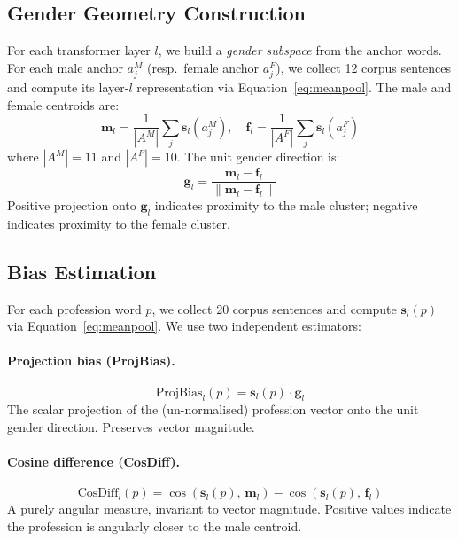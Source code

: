 \documentclass[11pt,a4paper]{article}
\begin{document}
\subsection{Gender Geometry Construction}

For each transformer layer $l$, we build a \emph{gender subspace} from the
anchor words. For each male anchor $a^M_j$ (resp.\ female anchor $a^F_j$), we
collect 12 corpus sentences and compute its layer-$l$ representation via
Equation~\ref{eq:meanpool}. The male and female centroids are:
\begin{equation}
  \mathbf{m}_l = \frac{1}{|A^M|} \sum_{j} \mathbf{s}_l(a^M_j), \quad
  \mathbf{f}_l = \frac{1}{|A^F|} \sum_{j} \mathbf{s}_l(a^F_j)
\end{equation}
where $|A^M|=11$ and $|A^F|=10$. The unit gender direction is:
\begin{equation}
  \mathbf{g}_l = \frac{\mathbf{m}_l - \mathbf{f}_l}
                      {\|\mathbf{m}_l - \mathbf{f}_l\|}
\end{equation}
Positive projection onto $\mathbf{g}_l$ indicates proximity to the male cluster;
negative indicates proximity to the female cluster.

\subsection{Bias Estimation}

For each profession word $p$, we collect 20 corpus sentences and compute
$\mathbf{s}_l(p)$ via Equation~\ref{eq:meanpool}. We use two independent
estimators:

\paragraph{Projection bias (ProjBias).}
\begin{equation}
  \text{ProjBias}_l(p) = \mathbf{s}_l(p) \cdot \mathbf{g}_l
  \label{eq:proj}
\end{equation}
The scalar projection of the (un-normalised) profession vector onto the unit
gender direction. Preserves vector magnitude.

\paragraph{Cosine difference (CosDiff).}
\begin{equation}
  \text{CosDiff}_l(p) =
    \cos\!\left(\mathbf{s}_l(p),\,\mathbf{m}_l\right) -
    \cos\!\left(\mathbf{s}_l(p),\,\mathbf{f}_l\right)
  \label{eq:cosdiff}
\end{equation}
A purely angular measure, invariant to vector magnitude. Positive values
indicate the profession is angularly closer to the male centroid.
\end{document}

